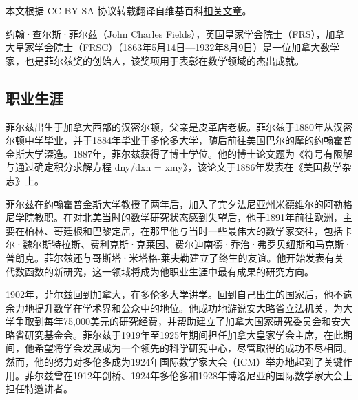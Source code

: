 
本文根据 CC-BY-SA 协议转载翻译自维基百科\href{https://en.wikipedia.org/wiki/John_Charles_Fields}{相关文章}。

约翰·查尔斯·菲尔兹（John Charles Fields），英国皇家学会院士（FRS），加拿大皇家学会院士（FRSC）（1863年5月14日—1932年8月9日）是一位加拿大数学家，也是菲尔兹奖的创始人，该奖项用于表彰在数学领域的杰出成就。
\subsection{职业生涯}  
菲尔兹出生于加拿大西部的汉密尔顿，父亲是皮革店老板。菲尔兹于1880年从汉密尔顿中学毕业，并于1884年毕业于多伦多大学，随后前往美国巴尔的摩的约翰霍普金斯大学深造。1887年，菲尔兹获得了博士学位。他的博士论文题为《符号有限解与通过确定积分求解方程 dny/dxn = xmy》，该论文于1886年发表在《美国数学杂志》上。

菲尔兹在约翰霍普金斯大学教授了两年后，加入了宾夕法尼亚州米德维尔的阿勒格尼学院教职。在对北美当时的数学研究状态感到失望后，他于1891年前往欧洲，主要在柏林、哥廷根和巴黎定居，在那里他与当时一些最伟大的数学家交往，包括卡尔·魏尔斯特拉斯、费利克斯·克莱因、费尔迪南德·乔治·弗罗贝纽斯和马克斯·普朗克。菲尔兹还与哥斯塔·米塔格-莱夫勒建立了终生的友谊。他开始发表有关代数函数的新研究，这一领域将成为他职业生涯中最有成果的研究方向。

1902年，菲尔兹回到加拿大，在多伦多大学讲学。回到自己出生的国家后，他不遗余力地提升数学在学术界和公众中的地位。他成功地游说安大略省立法机关，为大学争取到每年75,000美元的研究经费，并帮助建立了加拿大国家研究委员会和安大略省研究基金会。菲尔兹于1919年至1925年期间担任加拿大皇家学会主席，在此期间，他希望将学会发展成为一个领先的科学研究中心，尽管取得的成功不尽相同。然而，他的努力对多伦多成为1924年国际数学家大会（ICM）举办地起到了关键作用。菲尔兹曾在1912年剑桥、1924年多伦多和1928年博洛尼亚的国际数学家大会上担任特邀讲者。